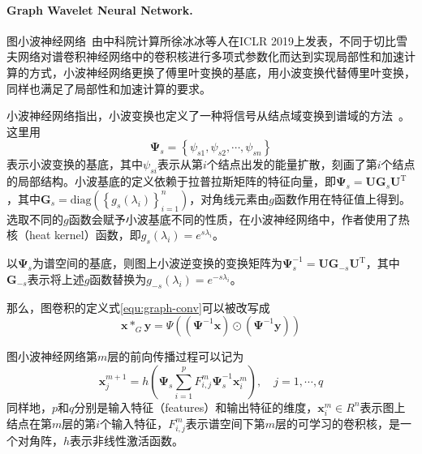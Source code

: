 \documentclass[final]{cvpr}
\newcommand{\mypara}[1]{\paragraph{#1.}}
\begin{document}
\mypara{Graph Wavelet Neural Network} 
图小波神经网络~\cite{xu2018graph}由中科院计算所徐冰冰等人在ICLR 2019上发表，不同于切比雪夫网络对谱卷积神经网络中的卷积核进行多项式参数化而达到实现局部性和加速计算的方式，小波神经网络更换了傅里叶变换的基底，用小波变换代替傅里叶变换，同样也满足了局部性和加速计算的要求。

小波神经网络指出，小波变换也定义了一种将信号从结点域变换到谱域的方法~\cite{hammond2011wavelets}。这里用
\begin{equation}
\boldsymbol{\Psi}_s=\left\{ \psi_{s1},\psi_{s2},\cdots,\psi_{sn} \right\}
\end{equation}
表示小波变换的基底，其中$\psi_{si}$表示从第$i$个结点出发的能量扩散，刻画了第$i$个结点的局部结构。小波基底的定义依赖于拉普拉斯矩阵的特征向量，即$\boldsymbol{\Psi}_s=\boldsymbol{U} \boldsymbol{G}_s \boldsymbol{U}^{\mathrm{T}}$，其中$\boldsymbol{G}_s= \mathrm{diag} \left( \left\{ g_s(\lambda_i) \right\}_{i=1}^n \right) $，对角线元素由$g$函数作用在特征值上得到。选取不同的$g$函数会赋予小波基底不同的性质，在小波神经网络中，作者使用了热核（heat kernel）函数，即$g_s(\lambda_i)=e^{s \lambda_i}$。

以$\boldsymbol{\Psi}_s$为谱空间的基底，则图上小波逆变换的变换矩阵为$\boldsymbol{\Psi}_s^{-1}=\boldsymbol{U} \boldsymbol{G}_{-s} \boldsymbol{U}^{\mathrm{T}}$，其中$\boldsymbol{G}_{-s}$表示将上述$g$函数替换为$g_{-s}(\lambda_i)=e^{-s \lambda_i}$。

那么，图卷积的定义式\ref{equ:graph-conv}可以被改写成
\begin{equation}\label{equ:gwnn-graph-conv}
    \boldsymbol{x}*_{G}\boldsymbol{y}={\Psi}
    \left(
        \left(
            \boldsymbol{\Psi}^{-1}\boldsymbol{x}
        \right)
        \odot 
        \left(
            \boldsymbol{\Psi}^{-1}\boldsymbol{y}
        \right)          
    \right)
\end{equation}

图小波神经网络第$m$层的前向传播过程可以记为
\begin{equation}\label{equ:gwnn-forward}
    \boldsymbol{x}_j^{m+1}=
    h \left(
        \boldsymbol{\Psi}_s
        \sum_{i=1}^{p}
        F_{i,j}^m 
        \boldsymbol{\Psi}_s^{-1}
        \boldsymbol{x}_i^{m}
    \right), \quad j=1,\cdots,q
\end{equation}
同样地，$p$和$q$分别是输入特征（features）和输出特征的维度，$\boldsymbol{x}_i^{m} \in R^n$表示图上结点在第$m$层的第$i$个输入特征，$F_{i,j}^m$表示谱空间下第$m$层的可学习的卷积核，是一个对角阵，$h$表示非线性激活函数。
\end{document}
